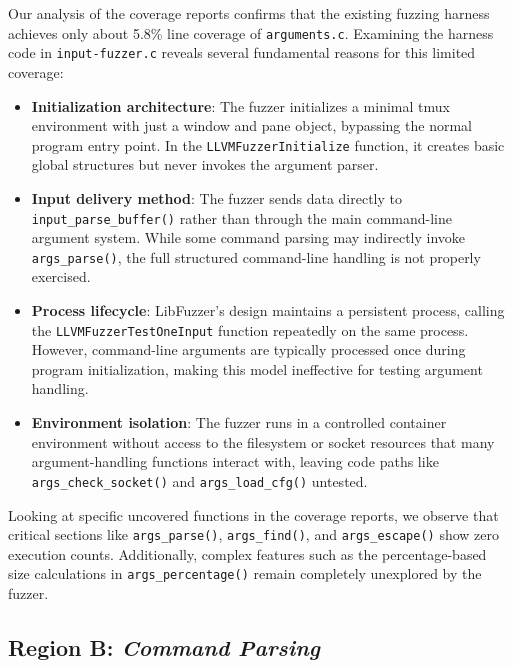 \documentclass[11pt,a4paper,twocolumn]{article}
\begin{document}
Our analysis of the coverage reports confirms that the existing fuzzing harness achieves only about 5.8\% line coverage of \texttt{arguments.c}. Examining the harness code in \texttt{input-fuzzer.c} reveals several fundamental reasons for this limited coverage:

\begin{itemize}
  \item \textbf{Initialization architecture}: The fuzzer initializes a minimal tmux environment with just a window and pane object, bypassing the normal program entry point. In the \texttt{LLVMFuzzerInitialize} function, it creates basic global structures but never invokes the argument parser.
  
  \item \textbf{Input delivery method}: The fuzzer sends data directly to \texttt{input\_parse\_buffer()} rather than through the main command-line argument system. While some command parsing may indirectly invoke \texttt{args\_parse()}, the full structured command-line handling is not properly exercised.
  
  \item \textbf{Process lifecycle}: LibFuzzer's design maintains a persistent process, calling the \texttt{LLVMFuzzerTestOneInput} function repeatedly on the same process. However, command-line arguments are typically processed once during program initialization, making this model ineffective for testing argument handling.
  
  \item \textbf{Environment isolation}: The fuzzer runs in a controlled container environment without access to the filesystem or socket resources that many argument-handling functions interact with, leaving code paths like \texttt{args\_check\_socket()} and \texttt{args\_load\_cfg()} untested.
\end{itemize}

Looking at specific uncovered functions in the coverage reports, we observe that critical sections like \texttt{args\_parse()}, \texttt{args\_find()}, and \texttt{args\_escape()} show zero execution counts. Additionally, complex features such as the percentage-based size calculations in \texttt{args\_percentage()} remain completely unexplored by the fuzzer.

\subsection*{Region B: \textit{Command Parsing}}
\end{document}
